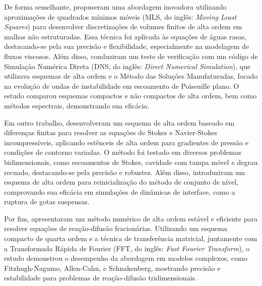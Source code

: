 De forma semelhante,  propuseram uma abordagem inovadora utilizando aproximações de quadrados mínimos móveis (MLS, do inglês: \textit{Moving Least Squares}) para desenvolver discretizações de volumes finitos de alta ordem em malhas não estruturadas. Essa técnica foi aplicada às equações de águas rasas, destacando-se pela sua precisão e flexibilidade, especialmente na modelagem de fluxos viscosos. Além disso,  conduziram um teste de verificação com um código de Simulação Numérica Direta (DNS, do inglês: \textit{Direct Numerical Simulation}), que utilizava esquemas de alta ordem e o Método das Soluções Manufaturadas, focado na evolução de ondas de instabilidade em escoamento de Poiseuille plano. O estudo comparou esquemas compactos e não compactos de alta ordem, bem como métodos espectrais, demonstrando sua eficácia.

Em outro trabalho,  desenvolveram um esquema de alta ordem baseado em diferenças finitas para resolver as equações de Stokes e Navier-Stokes incompressíveis, aplicando estênceis de alta ordem para gradientes de pressão e condições de contorno variadas. O método foi testado em diversos problemas bidimensionais, como escoamentos de Stokes, cavidade com tampa móvel e degrau recuado, destacando-se pela precisão e robustez. Além disso,  introduziram um esquema de alta ordem para reinicialização do método de conjunto de nível, comprovando sua eficácia em simulações de dinâmicas de interface, como a ruptura de gotas suspensas.

Por fim,  apresentaram um método numérico de alta ordem estável e eficiente para resolver equações de reação-difusão fracionárias. Utilizando um esquema compacto de quarta ordem e a técnica de transferência matricial, juntamente com a Transformada Rápida de Fourier (FFT, do inglês: \textit{Fast Fourier Transform}), o estudo demonstrou o desempenho da abordagem em modelos complexos, como Fitzhugh-Nagumo, Allen-Cahn, e Schnakenberg, mostrando precisão e estabilidade para problemas de reação-difusão tridimensionais.

